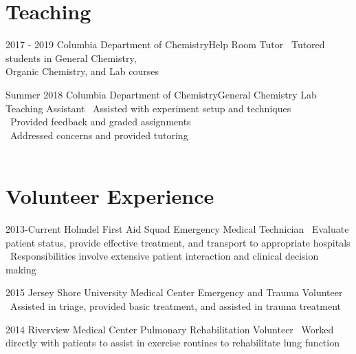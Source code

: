 \documentclass{bscv}
\begin{document}
\section{Teaching}
\begin{eventlist}
\item{2017 - 2019}
  {Columbia Department of Chemistry}{Help Room Tutor}
  \textbullet\  Tutored students in General Chemistry, \\  Organic Chemistry, and Lab courses

\item{Summer 2018}
  {Columbia Department of Chemistry}{General Chemistry Lab Teaching Assistant}
  \textbullet\ Assisted with experiment setup and techniques \\
  \textbullet\ Provided feedback and graded assignments \\
  \textbullet\ Addressed concerns and provided tutoring \\
  \ 
 
\end{eventlist}

\section{Volunteer Experience}

\begin{eventlist}
\item{2013-Current}
  {Holmdel First Aid Squad}
  {Emergency Medical Technician}
  {\textbullet\ Evaluate patient status, provide effective treatment, and transport to appropriate hospitals \newline \textbullet\ Responsibilities involve extensive patient interaction and clinical decision making}

\item{2015}
  {Jersey Shore University Medical Center}
  {Emergency and Trauma Volunteer}
  {\textbullet\ Assisted in triage, provided basic treatment, and assisted in trauma treatment}

\item{2014}
  {Riverview Medical Center}
  {Pulmonary Rehabilitation Volunteer}
  {\textbullet\ Worked directly with patients to assist in exercise routines to rehabilitate lung function}
  
\end{eventlist}

\end{document}
